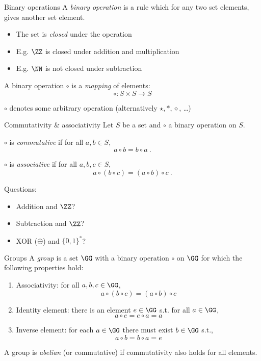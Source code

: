 \begin{frame}{Binary operations}
  A \emph{binary operation} is a rule which for any two set elements, gives another set element.
  \begin{itemize}[<+(1)->]
    \item The set is \emph{closed} under the operation
    \item E.g. $\ZZ$ is closed under addition and multiplication
    \item E.g. $\NN$ is not closed under subtraction
  \end{itemize}

  \pause
  A binary operation $\circ$ is a \emph{mapping} of elements:
  \[
    \circ: S \times S \to S
  \]

  \pause
  $\circ$ denotes some arbitrary operation (alternatively $\star, \ast, \diamond$, \dots)
\end{frame}

\begin{frame}{Commutativity \& associativity}
  Let $S$ be a set and $\circ$ a binary operation on $S$.

  \pause
  $\circ$ is \emph{commutative} if for all $a, b\in S$,
  \[
      a \circ b = b \circ a\ .
  \]

  \pause
  $\circ$ is \emph{associative} if for all $a, b, c\in S$,
  \[
    a \circ (b \circ c) = (a \circ b) \circ c\ .
  \]

  \pause
  Questions:
  \begin{itemize}[<+(1)->]
    \item Addition and $\ZZ$?
    \item Subtraction and $\ZZ$?
    \item XOR ($\oplus$) and $\{0,1\}^*$?
  \end{itemize}
\end{frame}

\begin{frame}{Groups}
  A \emph{group} is a set $\GG$ with a binary operation $\circ$ on $\GG$ for which the following properties hold:
  \begin{enumerate}[<+(1)->]
    \item Associativity: for all $a, b, c\in \GG$,
    \[
      a \circ (b \circ c) = (a \circ b) \circ c
    \]
    \item Identity element: there is an element $e\in \GG$ s.t. for all $a\in \GG$,
    \[
      a \circ e = e \circ a = a
    \]
    \item Inverse element: for each $a\in \GG$ there must exist $b\in \GG$ s.t.,
    \[
      a \circ b = b \circ a = e
    \]
  \end{enumerate}
  \vspace*{-1em}
  \pause
  A group is \emph{abelian} (or commutative) if commutativity also holds for all elements.
\end{frame}

